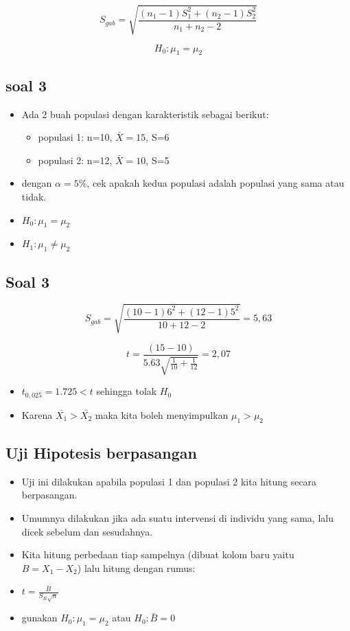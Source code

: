 \documentclass[
  letterpaper,
  DIV=11,
  numbers=noendperiod]{scrartcl}
\begin{document}
\[
S_{gab}=\sqrt{\frac{(n_1-1)S_1^2+(n_2-1)S_2^2}{n_1+n_2-2}}
\]

\[
H_0: \mu_1=\mu_2
\]

\subsection{soal 3}\label{soal-3-1}

\begin{itemize}
\item
  Ada 2 buah populasi dengan karakteristik sebagai berikut:

  \begin{itemize}
  \item
    populasi 1: n=10, \(\bar{X}=15\), S=6
  \item
    populasi 2: n=12, \(\bar{X}=10\), S=5
  \end{itemize}
\item
  dengan \(\alpha=5\%\), cek apakah kedua populasi adalah populasi yang
  sama atau tidak.
\item
  \(H_0: \mu_1 = \mu_2\)
\item
  \(H_1: \mu_1 \neq \mu_2\)
\end{itemize}

\subsection{Soal 3}\label{soal-3-2}

\[
S_{gab}=\sqrt{\frac{(10-1)6^2+(12-1)5^2}{10+12-2}}= 5,63
\]

\[
t=\frac{(15-10)}{5.63\sqrt{\frac{1}{10}+\frac{1}{12}}}=2,07
\]

\begin{itemize}
\item
  \(t_{0,025}=1.725 < t\) sehingga tolak \(H_0\)
\item
  Karena \(\bar{X_1}>\bar{X_2}\) maka kita boleh menyimpulkan
  \(\mu_1>\mu_2\)
\end{itemize}

\subsection{Uji Hipotesis berpasangan}\label{uji-hipotesis-berpasangan}

\begin{itemize}
\item
  Uji ini dilakukan apabila populasi 1 dan populasi 2 kita hitung secara
  berpasangan.
\item
  Umumnya dilakukan jika ada suatu intervensi di individu yang sama,
  lalu dicek sebelum dan sesudahnya.
\item
  Kita hitung perbedaan tiap sampelnya (dibuat kolom baru yaitu
  \(B=X_1-X_2\)) lalu hitung dengan rumus:
\item
  \(t=\frac{\bar{B}}{S_B\sqrt{n}}\)
\item
  gunakan \(H_0: \mu_1=\mu_2\) atau \(H_0: \bar{B}=0\)
\end{itemize}
\end{document}
